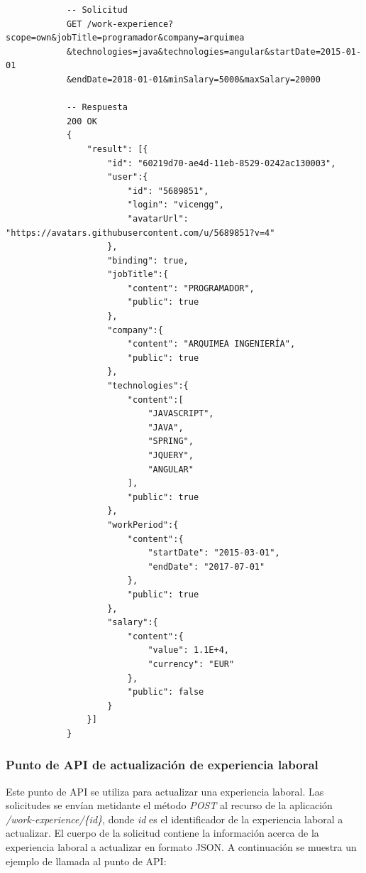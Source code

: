 \documentclass[a4paper, 12pt]{book}
\begin{document}
        {\footnotesize
    \begin{verbatim}
			-- Solicitud
			GET /work-experience?scope=own&jobTitle=programador&company=arquimea
			&technologies=java&technologies=angular&startDate=2015-01-01
			&endDate=2018-01-01&minSalary=5000&maxSalary=20000

			-- Respuesta
			200 OK
			{
			    "result": [{
			        "id": "60219d70-ae4d-11eb-8529-0242ac130003",
			        "user":{
			            "id": "5689851",
			            "login": "vicengg",
			            "avatarUrl": "https://avatars.githubusercontent.com/u/5689851?v=4"
			        },
			        "binding": true,
			        "jobTitle":{
			            "content": "PROGRAMADOR",
			            "public": true
			        },
			        "company":{
			            "content": "ARQUIMEA INGENIERÍA",
			            "public": true
			        },
			        "technologies":{
			            "content":[
			                "JAVASCRIPT",
			                "JAVA",
			                "SPRING",
			                "JQUERY",
			                "ANGULAR"
			            ],
			            "public": true
			        },
			        "workPeriod":{
			            "content":{
			                "startDate": "2015-03-01", 
			                "endDate": "2017-07-01"
			            },
			            "public": true
			        },
			        "salary":{
			            "content":{
			                "value": 1.1E+4, 
			                "currency": "EUR"
			            },
			            "public": false
			        }
			    }]
			}
    \end{verbatim}
    }

    \subsubsection{Punto de API de actualización de experiencia laboral}
    \label{subsec:put_work_experience}
    Este punto de API se utiliza para actualizar una experiencia laboral.
    Las solicitudes se envían metidante el método \emph{POST} al recurso de la aplicación \emph{/work-experience/\{id\}}, donde \emph{id} es el identificador de la experiencia laboral a actualizar.
    El cuerpo de la solicitud contiene la información acerca de la experiencia laboral a actualizar en formato JSON.
    A continuación se muestra un ejemplo de llamada al punto de API:
\end{document}
